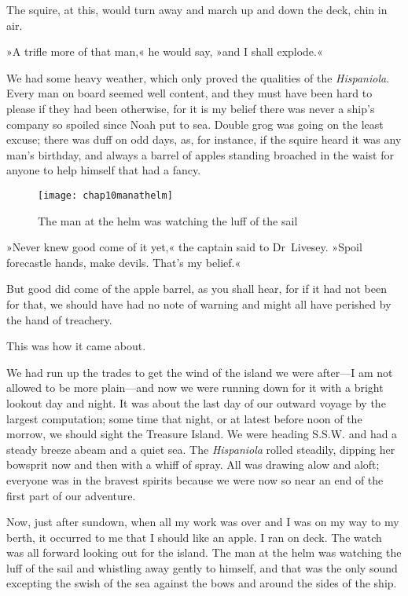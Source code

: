 The squire, at this, would turn away and march up and down the deck, chin in air.

»A trifle more of that man,« he would say, »and I shall explode.«

We had some heavy weather, which only proved the qualities of the \textit{Hispaniola}. Every man on board seemed well content, and they must have been hard to please if they had been otherwise, for it is my belief there was never a ship's company so spoiled since Noah put to sea. Double grog was going on the least excuse; there was duff on odd days, as, for instance, if the squire heard it was any man's birthday, and always a barrel of apples standing broached in the waist for anyone to help himself that had a fancy.

 \begin{figure}[ph]
\centering
\texttt{[image: chap10manathelm]}
\caption{The man at the helm was watching the luff of the sail}
\end{figure}

»Never knew good come of it yet,« the captain said to Dr~Livesey. »Spoil forecastle hands, make devils. That's my belief.«

But good did come of the apple barrel, as you shall hear, for if it had not been for that, we should have had no note of warning and might all have perished by the hand of treachery.

This was how it came about.

We had run up the trades to get the wind of the island we were after—I am not allowed to be more plain—and now we were running down for it with a bright lookout day and night. It was about the last day of our outward voyage by the largest computation; some time that night, or at latest before noon of the morrow, we should sight the Treasure Island. We were heading S.S.W. and had a steady breeze abeam and a quiet sea. The \textit{Hispaniola} rolled steadily, dipping her bowsprit now and then with a whiff of spray. All was drawing alow and aloft; everyone was in the bravest spirits because we were now so near an end of the first part of our adventure.

Now, just after sundown, when all my work was over and I was on my way to my berth, it occurred to me that I should like an apple. I ran on deck. The watch was all forward looking out for the island. The man at the helm was watching the luff of the sail and whistling away gently to himself, and that was the only sound excepting the swish of the sea against the bows and around the sides of the ship.




